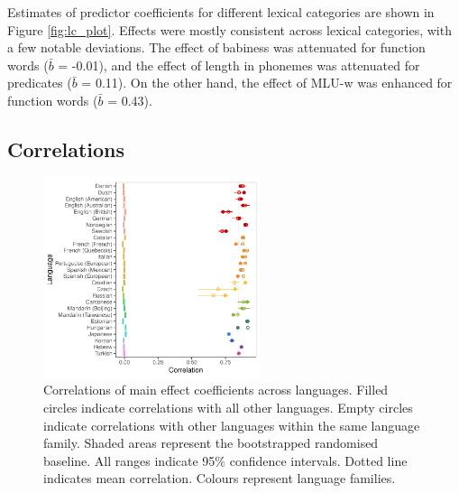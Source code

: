 \documentclass[10pt, letterpaper]{article}
\newenvironment{CodeChunk}{}{}
\begin{document}
Estimates of predictor coefficients for different lexical categories are
shown in Figure \ref{fig:lc_plot}. Effects were mostly consistent across
lexical categories, with a few notable deviations. The effect of
babiness was attenuated for function words (\(\bar{b}\) = -0.01), and
the effect of length in phonemes was attenuated for predicates
(\(\bar{b}\) = 0.11). On the other hand, the effect of MLU-w was
enhanced for function words (\(\bar{b}\) = 0.43).

\hypertarget{correlations}{%
\subsection{Correlations}\label{correlations}}

\begin{CodeChunk}
\begin{figure}[ht]

{\centering \includegraphics[width=240px]{figs/correlations-1} 

}

\caption[Correlations of main effect coefficients across languages]{Correlations of main effect coefficients across languages. Filled circles indicate correlations with all other languages. Empty circles indicate correlations with other languages within the same language family. Shaded areas represent the bootstrapped randomised baseline. All ranges indicate 95\% confidence intervals. Dotted line indicates mean correlation. Colours represent language families.}\label{fig:correlations}
\end{figure}
\end{CodeChunk}
\end{document}

